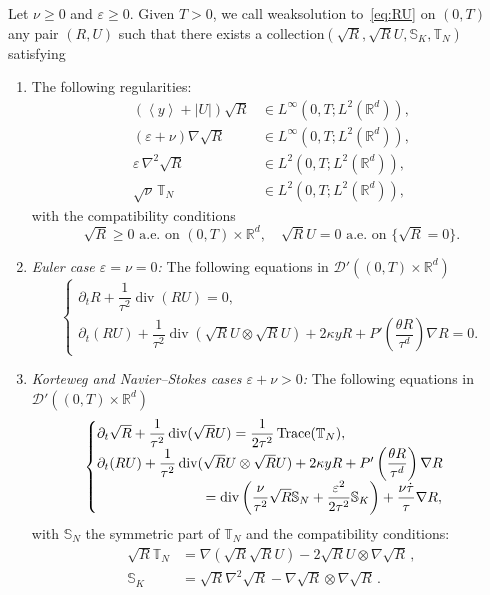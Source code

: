 \documentclass[AHL,Unicode,longabstracts]{cedram}
\DeclareMathOperator{\DIV}{div}
\DeclareMathOperator{\Trace}{Trace}
\newcommand*\R{\mathbb{R}}
\newcommand*\<{\left\langle}
\renewcommand*\>{\right\rangle}
\renewcommand*\ge{\geqslant}
\newcommand*\eps{\varepsilon}
\begin{document}
\begin{defi}\label{def_weaksol}
Let $\nu \ge 0$ and $\varepsilon \ge 0.$ Given $T >0$, we call weak\linebreak solution to~\eqref{eq:RU} on $(0,T)$ any pair $(R,U)$ such that there exists a collection\linebreak $(\sqrt{R},\sqrt{R}U,\mathbb S_{K},\mathbb T_{N})$ satisfying
\begin{enumerate}
\item \label{2.6.1} The following regularities:
\begin{align*}
\left(\<y\>+|U|\right) \sqrt{R} &\in L^{\infty}\left(0,T; L^2 (\R^d)\right),\\
(\eps+\nu)\nabla \sqrt R &\in L^{\infty}\left(0,T; L^2 (\R^d)\right),\\
\varepsilon \, \nabla^2 \sqrt{R} &\in L^2(0,T;L^2(\mathbb R^d)),\\
\sqrt \nu \, \mathbb T_N &\in L^2(0,T; L^2(\mathbb R^d)),
\end{align*}
with the compatibility conditions
\[
\sqrt{R} \ge 0 \text{ a.e. on } (0,T)\times \R^d, \quad \sqrt{R}U= 0 \text{ a.e. on } \{\sqrt{R} = 0 \}.
\]

\item \label{2.6.2} \emph{Euler case $\eps=\nu=0$:} The following equations in $\mathcal D'((0,T)\times \mathbb R^d)$
\begin{equation}\label{eq:NSKrevu-euler}
\begin{cases}
\partial_t{R}+\dfrac{1}{\tau^2}\DIV ({R} U)= 0,\\
\partial_t ({R}U) +\dfrac{1}{\tau^2}\DIV (\sqrt{R}U \otimes \sqrt{R}U) +2\kappa y R + P'\left(\dfrac{\theta R}{\tau^d}\right)\nabla R =0.
\end{cases}
\end{equation}

\item \label{2.6.3} \emph{Korteweg and Navier--Stokes cases $\eps + \nu > 0$:} The following equations in $\mathcal D'((0,T)\times \mathbb R^d)$
\begin{equation}\label{eq:NSKrevu}
\begin{cases}
\partial_t\sqrt{R}+\dfrac{1}{\tau^2}\DIV(\sqrt{R}U)=\dfrac{1}{2\tau^2}\Trace(\mathbb T_N),\\
\partial_t ({R}U) +\dfrac{1}{\tau^2}\DIV (\sqrt{R}U \otimes \sqrt{R}U) +2\kappa y R + P'\left(\dfrac{\theta R}{\tau^d}\right)\nabla R\\
\mkern 140mu =\DIV \left(\dfrac{\nu}{\tau^2} \sqrt R \mathbb S_N + \dfrac{\varepsilon^2}{2\tau^2} \mathbb S_K\right) + \dfrac{\nu \dot{\tau}}{\tau} \nabla R,
\end{cases}
\end{equation}
with $\mathbb S_N$ the symmetric part of $\mathbb T_N$ and the compatibility conditions:
\begin{align}\label{eq_compnewton}
\sqrt{R}\mathbb T_{N} &= \nabla(\sqrt{R} \sqrt{R} U) - 2 \sqrt{R}U \otimes \nabla \sqrt{R}\,, \\
\mathbb S_K &=\sqrt{R}\nabla^2 \sqrt{R} - \nabla \sqrt{R} \otimes \nabla \sqrt{R}
\,. \label{eq_compkorteweg}
\end{align}
\end{enumerate}
\end{defi}
\end{document}
